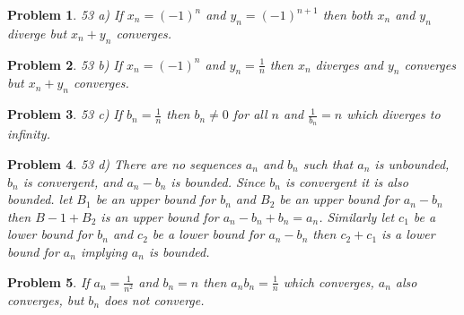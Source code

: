 \documentclass{article}
\newtheorem*{Problem}{Problem}
\begin{document}
\begin{Problem}
   53 a) If $x_n=(-1)^n$ and $y_n=(-1)^{n+1}$ then both $x_n$ and $y_n$ diverge but $x_n+y_n$ converges.
\end{Problem}
\begin{Problem}
   53 b) If $x_n=(-1)^n$ and $y_n=\frac{1}{n}$ then $x_n$ diverges and $y_n$ converges but $x_n+y_n$ converges.
\end{Problem}
\begin{Problem}
   53 c) If $b_n=\frac{1}{n}$ then $b_n\neq 0$ for all $n$ and $\frac{1}{b_n}=n$ which diverges to infinity.
\end{Problem}
\begin{Problem}
   53 d) There are no sequences $a_n$ and $b_n$ such that $a_n$ is unbounded, $b_n$ is convergent, and $a_n-b_n$ is bounded.  Since $b_n$ is convergent it is also bounded.  let $B_1$   be an upper bound for $b_n$ and $B_2$ be an upper bound for $a_n-b_n$ then $B-1+B_2$ is an upper bound for $a_n-b_n+b_n=a_n$.  Similarly let $c_1$ be a lower bound for $b_n$ and $c_2$ be a lower bound for $a_n-b_n$ then $c_2 + c_1$ is a lower bound for $a_n$ implying $a_n$ is bounded.
\end{Problem}
\begin{Problem}
    If $a_n=\frac{1}{n^2}$ and $b_n=n$ then $a_n b_n = \frac{1}{n}$ which converges, $a_n $ also converges, but $b_n$ does not converge.
\end{Problem}
\end{document}
